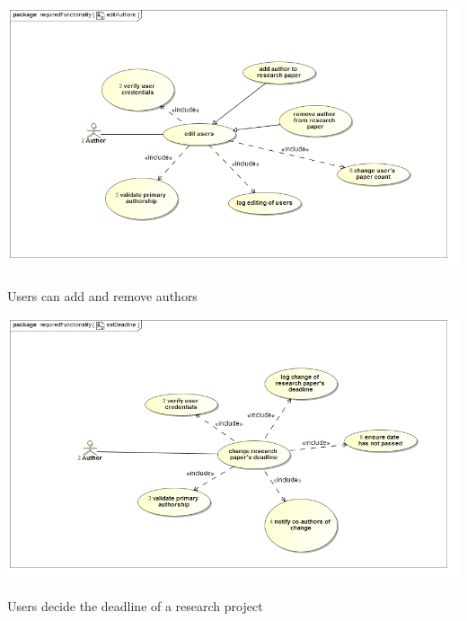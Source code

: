 \documentclass[a4paper,12pt]{report}
\begin{document}
\begin{flushleft}
	\includegraphics[scale=0.5]{./images/uc__editAuthors.jpg}
	\begin{center}
		Users can add and remove authors
	\end{center}

	\includegraphics[scale=0.5]{./images/uc__setDeadline.jpg}
	\begin{center}
		Users decide the deadline of a research project
	\end{center}
\end{flushleft}

\newpage
\end{document}

